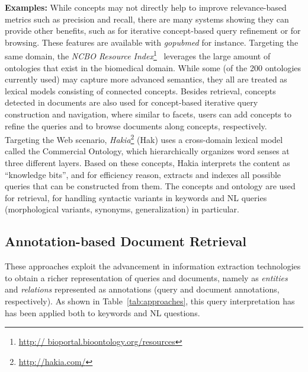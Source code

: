\textbf{Examples:} While concepts may not directly help to improve relevance-based metrics such as precision and recall, there are many systems showing they can provide other benefits, such as for iterative concept-based query refinement or for browsing. These features are available with \emph{gopubmed} for instance. Targeting the same domain, the \emph{NCBO Resource Index}\footnote{\url{http://
bioportal.bioontology.org/resources}}~\cite{DBLP:journals/ws/JonquetLFCNMS11} leverages the large amount of ontologies that exist in the biomedical domain. While some (of the 200 ontologies currently used) may capture more advanced semantics, they all are treated as lexical models consisting of connected concepts. Besides retrieval, concepts detected in documents are also used for concept-based iterative query construction and navigation, where similar to facets, users can add concepts to refine the queries and to browse documents along concepts, respectively. Targeting the Web scenario, \emph{Hakia}\footnote{\url{http://hakia.com/}} (Hak) uses a cross-domain lexical model called the Commercial Ontology, which hierarchically organizes word senses at three different layers. Based on these concepts, Hakia interprets the content as ``knowledge bits'', and for efficiency reason, extracts and indexes all possible queries that can be constructed from them. The concepts and ontology are used for retrieval, for handling syntactic variants in keywords and NL queries (morphological variants, synonyms, generalization) in particular.  

\subsection{Annotation-based Document Retrieval} These approaches exploit the advancement in information extraction technologies to obtain a richer representation of queries and documents, namely as \emph{entities} and \emph{relations} represented as annotations (query and document annotations, respectively). As shown in Table~\ref{tab:approaches}, this query interpretation has has been applied both to keywords and NL questions. 

